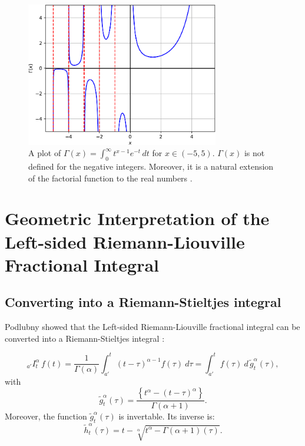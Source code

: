 \documentclass[twoside,reqno,11pt]{fcaa-var} %
\begin{document}
\begin{figure}[htb]
\centering
\includegraphics[width=0.75\textwidth]{gamma.pdf}
\caption{A plot of $\Gamma(x) = \int_0^{\infty} t^{x-1} e^{-t}\,dt$ for $x\in(-5,5)$. $\Gamma(x)$ is not defined for the negative integers. Moreover, it is a natural extension of the factorial function to the real numbers \cite{euler1738}.}
\label{fig:gamma}
\end{figure}

\section{Geometric Interpretation of the Left-sided Riemann-Liouville Fractional Integral}

\subsection{Converting into a Riemann-Stieltjes integral}
Podlubny showed that the Left-sided Riemann-Liouville fractional integral can be converted into a Riemann-Stieltjes integral \cite{podlubny02}:

\begin{equation}
_{a'}I_t^{\alpha}\,f(t) = \frac{1}{\Gamma(\alpha)}\int_{a'}^{t}(t-\tau)^{\alpha-1}f(\tau)~d\tau = \int_{a'}^{t} f(\tau)~d\,\widetilde{g}_t^{\alpha}(\tau), 
\end{equation}
with 
\begin{equation}
\label{eq:g_rl}
\widetilde{g}_t^{\alpha}(\tau) = \frac{\left \{t^{\alpha} - (t-\tau)^{\alpha} \right \}}{\Gamma(\alpha+1)}. 
\end{equation}
Moreover, the function $\widetilde{g}_t^{\alpha}(\tau)$ is invertable. Its inverse is:
\begin{equation}
\widetilde{h}_t^{\alpha}(\tau) = t - \sqrt[\alpha]{t^{\alpha} - \Gamma(\alpha+1)(\tau)}.
\end{equation}
\end{document}
